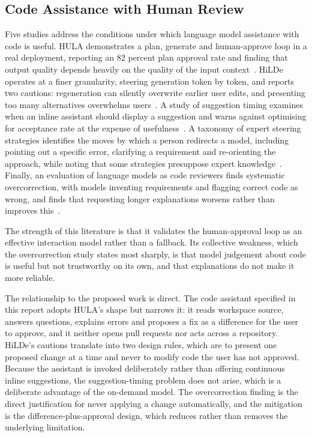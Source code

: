 \documentclass{FastFyp}
\begin{document}
\subsection{Code Assistance with Human Review}
Five studies address the conditions under which language model assistance with code is useful. HULA demonstrates a plan, generate and human-approve loop in a real deployment, reporting an 82 percent plan approval rate and finding that output quality depends heavily on the quality of the input context~\cite{ref:takerngsaksiri2025}. HiLDe operates at a finer granularity, steering generation token by token, and reports two cautions: regeneration can silently overwrite earlier user edits, and presenting too many alternatives overwhelms users~\cite{ref:gonzalez2025}. A study of suggestion timing examines when an inline assistant should display a suggestion and warns against optimising for acceptance rate at the expense of usefulness~\cite{ref:mozannar2024}. A taxonomy of expert steering strategies identifies the moves by which a person redirects a model, including pointing out a specific error, clarifying a requirement and re-orienting the approach, while noting that some strategies presuppose expert knowledge~\cite{ref:chidambaram2024}. Finally, an evaluation of language models as code reviewers finds systematic overcorrection, with models inventing requirements and flagging correct code as wrong, and finds that requesting longer explanations worsens rather than improves this~\cite{ref:jin2026}.

The strength of this literature is that it validates the human-approval loop as an effective interaction model rather than a fallback. Its collective weakness, which the overcorrection study states most sharply, is that model judgement about code is useful but not trustworthy on its own, and that explanations do not make it more reliable.

The relationship to the proposed work is direct. The code assistant specified in this report adopts HULA's shape but narrows it: it reads workspace source, answers questions, explains errors and proposes a fix as a difference for the user to approve, and it neither opens pull requests nor acts across a repository. HiLDe's cautions translate into two design rules, which are to present one proposed change at a time and never to modify code the user has not approved. Because the assistant is invoked deliberately rather than offering continuous inline suggestions, the suggestion-timing problem does not arise, which is a deliberate advantage of the on-demand model. The overcorrection finding is the direct justification for never applying a change automatically, and the mitigation is the difference-plus-approval design, which reduces rather than removes the underlying limitation.
\end{document}
